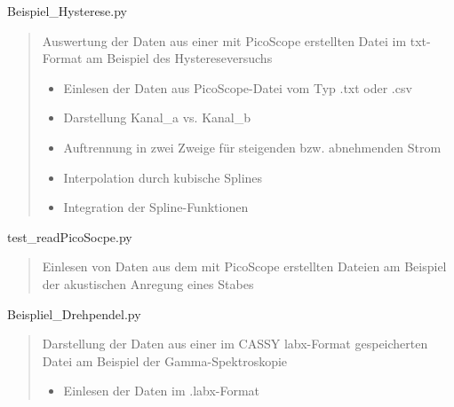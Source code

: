 \documentclass[letterpaper,10pt,english]{sphinxmanual}
\begin{document}
\label{\detokenize{index:module-Beispiel_Hysterese}}
Beispiel\_Hysterese.py
\begin{quote}

Auswertung der Daten aus einer mit PicoScope erstellten Datei
im txt-Format am Beispiel des Hystereseversuchs
\begin{itemize}
\item {} 
Einlesen der Daten aus PicoScope-Datei vom Typ .txt oder .csv

\item {} 
Darstellung  Kanal\_a vs. Kanal\_b

\item {} 
Auftrennung in zwei Zweige für steigenden bzw. abnehmenden Strom

\item {} 
Interpolation durch kubische Splines

\item {} 
Integration der Spline-Funktionen

\end{itemize}
\end{quote}
\label{\detokenize{index:module-Beispiel_Wellenform}}
test\_readPicoSocpe.py
\begin{quote}

Einlesen von Daten aus dem mit PicoScope erstellten Dateien
am Beispiel der akustischen Anregung eines Stabes
\end{quote}
\label{\detokenize{index:module-Beispiel_GammaSpektroskopie}}
Beispliel\_Drehpendel.py
\begin{quote}

Darstellung der Daten aus einer im CASSY labx-Format gespeicherten Datei
am Beispiel der Gamma-Spektroskopie
\begin{itemize}
\item {} 
Einlesen der Daten im .labx-Format

\end{itemize}
\end{quote}
\end{document}
